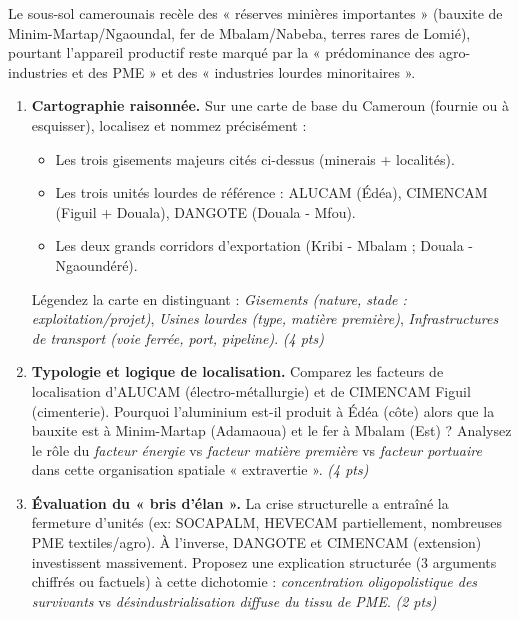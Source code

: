 \documentclass[11pt]{article}
\begin{document}
\begin{exercice}
Le sous-sol camerounais recèle des « réserves minières importantes » (bauxite de Minim-Martap/Ngaoundal, fer de Mbalam/Nabeba, terres rares de Lomié), pourtant l'appareil productif reste marqué par la « prédominance des agro-industries et des PME » et des « industries lourdes minoritaires ».

\begin{enumerate}
    \item \textbf{Cartographie raisonnée.} Sur une carte de base du Cameroun (fournie ou à esquisser), localisez et nommez précisément :
    \begin{itemize}
        \item Les trois gisements majeurs cités ci-dessus (minerais + localités).
        \item Les trois unités lourdes de référence : ALUCAM (Édéa), CIMENCAM (Figuil + Douala), DANGOTE (Douala - Mfou).
        \item Les deux grands corridors d'exportation (Kribi - Mbalam ; Douala - Ngaoundéré).
    \end{itemize}
    Légendez la carte en distinguant : \textit{Gisements (nature, stade : exploitation/projet)}, \textit{Usines lourdes (type, matière première)}, \textit{Infrastructures de transport (voie ferrée, port, pipeline)}. \textit{(4 pts)}

    \item \textbf{Typologie et logique de localisation.} Comparez les facteurs de localisation d'ALUCAM (électro-métallurgie) et de CIMENCAM Figuil (cimenterie). Pourquoi l'aluminium est-il produit à Édéa (côte) alors que la bauxite est à Minim-Martap (Adamaoua) et le fer à Mbalam (Est) ? Analysez le rôle du \textit{facteur énergie} vs \textit{facteur matière première} vs \textit{facteur portuaire} dans cette organisation spatiale « extravertie ». \textit{(4 pts)}

    \item \textbf{Évaluation du « bris d'élan ».} La crise structurelle a entraîné la fermeture d'unités (ex: SOCAPALM, HEVECAM partiellement, nombreuses PME textiles/agro). À l'inverse, DANGOTE et CIMENCAM (extension) investissent massivement. Proposez une explication structurée (3 arguments chiffrés ou factuels) à cette dichotomie : \textit{concentration oligopolistique des survivants} vs \textit{désindustrialisation diffuse du tissu de PME}. \textit{(2 pts)}
\end{enumerate}
\end{exercice}
\end{document}
